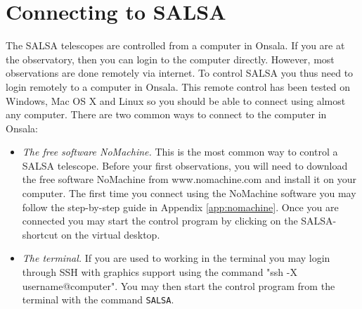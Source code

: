 %

\section{Connecting to SALSA} 
\label{sect-connect}
The SALSA telescopes are controlled from a computer in Onsala. If you are at
the observatory, then you can login to the computer directly. However, most
observations are done remotely via internet. To control SALSA you thus need to
login remotely to a computer in Onsala. This remote control has been tested
on Windows, Mac OS X and Linux so you should be able to connect using almost
any computer. There are two common ways to connect to the computer in Onsala:

\begin{itemize}
	\item{\emph{The free software NoMachine.} This is the most common way to control a
SALSA telescope. Before your first observations, you will need to download
the free software NoMachine from  www.nomachine.com and install it on
your computer.  The first time you connect using the NoMachine software you may
follow the step-by-step guide in Appendix \ref{app:nomachine}.} Once you are
connected you may start the control program by clicking on the SALSA-shortcut
on the virtual desktop.
\item{\emph{The terminal.} If you are used to working in the terminal you may login
	through SSH with graphics support using the command "ssh -X
username@computer".  You may then start the control program from the terminal
with the command {\tt  SALSA}.}
\end{itemize}

